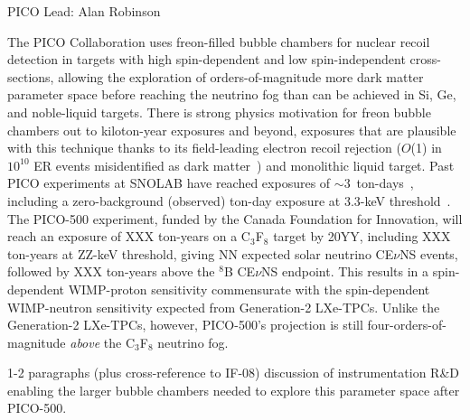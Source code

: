 PICO Lead: Alan Robinson

The PICO Collaboration uses freon-filled bubble chambers for nuclear recoil detection in targets with high spin-dependent and low spin-independent cross-sections, allowing the exploration of orders-of-magnitude more dark matter parameter space before reaching the neutrino fog than can be achieved in Si, Ge, and noble-liquid targets.  There is strong physics motivation for freon bubble chambers out to kiloton-year exposures and beyond, exposures that are plausible with this technique thanks to its field-leading electron recoil rejection ($O$(1) in $10^{10}$ ER events misidentified as dark matter~\cite{PICO:2019rsv}) and monolithic liquid target.  Past PICO experiments at SNOLAB have reached exposures of $\sim$3~ton-days~\cite{PICO:2019vsc}, including a zero-background (observed) ton-day exposure at 3.3-keV threshold~\cite{PICO:2017tgi}.  The PICO-500 experiment, funded by the Canada Foundation for Innovation, will reach an exposure of XXX ton-years on a C$_3$F$_8$ target by 20YY, including XXX ton-years at ZZ-keV threshold, giving NN expected solar neutrino CE$\nu$NS events, followed by XXX ton-years above the $^8$B CE$\nu$NS endpoint.  This results in a spin-dependent WIMP-proton sensitivity commensurate with the spin-dependent WIMP-neutron sensitivity expected from Generation-2 LXe-TPCs.  Unlike the Generation-2 LXe-TPCs, however, PICO-500's projection is still four-orders-of-magnitude \emph{above} the C$_3$F$_8$ neutrino fog.

1-2 paragraphs (plus cross-reference to IF-08) discussion of instrumentation R\&D enabling the larger bubble chambers needed to explore this parameter space after PICO-500.

